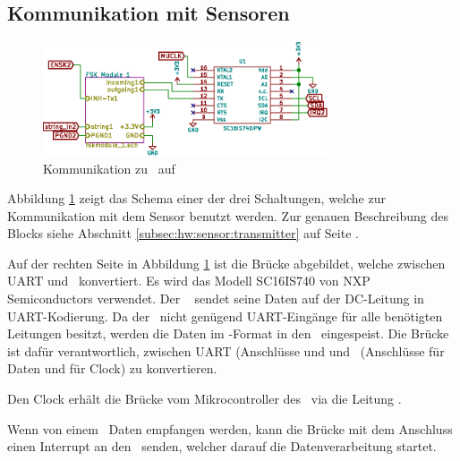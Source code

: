 \subsection{Kommunikation mit Sensoren}
\label{subsec:hw:master:sensorcomm}


\begin{figure}[h!t]
    \centering
    \includegraphics[width=0.75\textwidth]{images/superv-sch/supervisor--sch--comms.eps}
    \caption[\Master: Schema Kommunikation]{Kommunikation zu \Sensor~auf \Master}
    \label{fig:sch:master:comms}
\end{figure}

Abbildung     \ref{fig:sch:master:comms}     zeigt    das     Schema     einer
der    drei     Schaltungen,    welche     zur    Kommunikation     mit    dem
Sensor    benutzt     werden. Zur    genauen    Beschreibung     des    Blocks
 siehe Abschnitt \ref{subsec:hw:sensor:transmitter} auf
Seite \pageref{subsec:hw:sensor:transmitter}.

Auf der rechten Seite in Abbildung \ref{fig:sch:master:comms} ist die Br\"ucke
 abgebildet,  welche zwischen UART und  \ISC~konvertiert. Es wird das
Modell  SC16IS740 von  NXP Semiconductors  \cite{datasheet:uarti2c} verwendet.
Der \Sensor~ sendet seine Daten  auf der DC-Leitung in  UART-Kodierung. Da der
\Raspi~nicht  gen\"ugend  UART-Eing\"ange  f\"ur alle  ben\"otigten  Leitungen
besitzt,  werden  die  Daten  im \ISC-Format  in  den  \Raspi~eingespeist. Die
Br\"ucke   ist  daf\"ur verantwortlich,  zwischen UART  (Anschl\"usse
  und   und  \ISC~(Anschl\"usse   f\"ur Daten  und
 f\"ur Clock) zu konvertieren.

Den Clock erh\"alt die Br\"ucke vom Mikrocontroller des \Raspi~via die Leitung
.

Wenn  von einem  \Sensor~Daten  empfangen werden,  kann die  Br\"ucke mit  dem
Anschluss  einen Interrupt an den \Raspi~senden, welcher darauf die
Datenverarbeitung startet.

